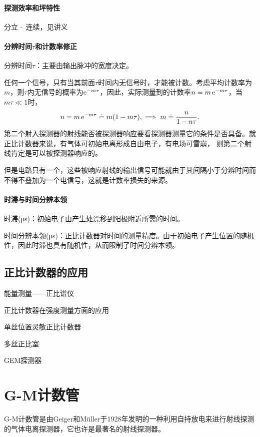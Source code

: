 \paragraph{探测效率和坪特性}
分立$~\text{-}~$连续，见讲义
\paragraph{分辨时间$\tau$和计数率修正}
分辨时间$\tau$：主要由输出脉冲的宽度决定。%

任何一个信号，只有当其前面$\tau$时间内无信号时，才能被计数。考虑平均计数率为$m$，则$\tau$内无信号的概率为$\mathop{}\!\mathrm{e}^{-m\tau}$，因此，实际测量到的计数率$n=m\mathop{}\!\mathrm{e}^{-m\tau}$，当$m\tau\ll 1$时，
\begin{align}
	n=m\mathop{}\!\mathrm{e}^{-m\tau}\doteq m(1-m\tau),\implies m\doteq\frac n{1-n\tau}.
\end{align}
第二个射入探测器的射线能否被探测器响应要看探测器测量它的条件是否具备。就正比计数器来说，有气体可初始电离形成自由电子，有电场可雪崩，%
则第二个射线肯定是可以被探测器响应的。%

但是电路只有一个，这些被响应射线的输出信号可能就由于其间隔小于分辨时间而不得不叠加为一个电信号，这就是计数率损失的来源。
\paragraph{时滞与时间分辨本领}
时滞(\si{\micro s})：初始电子由产生处漂移到阳极附近所需的时间。

时间分辨本领(\si{\micro s})：正比计数器对时间的测量精度。由于初始电子产生位置的随机性，因此时滞也具有随机性，从而限制了时间分辨本领。

\subsection{正比计数器的应用}

能量测量——正比谱仪

正比计数器在强度测量方面的应用

单丝位置灵敏正比计数器

多丝正比室

GEM探测器

\section{G-M计数管}

G-M计数管是由Geiger和Müller于1928年发明的一种利用自持放电来进行射线探测的气体电离探测器，它也许是最著名的射线探测器。

